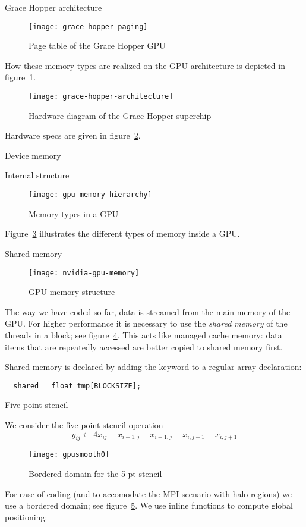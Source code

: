 {Grace Hopper architecture}

\begin{figure}[ht]
  \texttt{[image: grace-hopper-paging]}
  \caption{Page table of the Grace Hopper GPU}
  \label{fig:grace-hopper-paging}
\end{figure}
How these memory types are realized on the
GPU architecture is depicted in figure~\ref{fig:grace-hopper-paging}.

\begin{figure}[ht]
  \texttt{[image: grace-hopper-architecture]}
  \caption{Hardware diagram of the Grace-Hopper superchip}
  \label{fig:grace-hopper-hardware}
\end{figure}
Hardware specs are given in figure~\ref{fig:grace-hopper-hardware}.

 {Device memory}

 {Internal structure}

\begin{figure}[ht]
  \texttt{[image: gpu-memory-hierarchy]}
  \caption{Memory types in a GPU}
  \label{fig:gpu-hierarchy}
\end{figure}
Figure~\ref{fig:gpu-hierarchy} illustrates the different types of
memory inside a GPU.

 {Shared memory}

\begin{figure}[ht]
  \texttt{[image: nvidia-gpu-memory]}  
  \caption{GPU memory structure}
  \label{fig:gpu-memory}
\end{figure}
The way we have coded so far, data is streamed from the
main memory of the \ac{GPU}.
For higher performance it is necessary to use the
\emph{shared memory}
of the threads in a block; 
see figure~\ref{fig:gpu-memory}.
This acts like managed cache memory:
data items that are repeatedly accessed
are better copied to shared memory first.

Shared memory is declared by adding the keyword
 to a regular array declaration:
\begin{lstlisting}
__shared__ float tmp[BLOCKSIZE];
\end{lstlisting}

 {Five-point stencil}

We consider the five-point stencil operation
\[ y_{ij} \leftarrow 4x_{ij} -x_{i-1,j} -x_{i+1,j} -x_{i,j-1} -x_{i,j+1} \]
\begin{figure}[ht]
  \texttt{[image: gpusmooth0]}
  \caption{Bordered domain for the 5-pt stencil}
  \label{fig:cusmooth0}  
\end{figure}
For ease of coding (and to accomodate the MPI scenario with halo regions)
we use a bordered domain; see figure~\ref{fig:cusmooth0}.
We use inline functions to compute global positioning:

